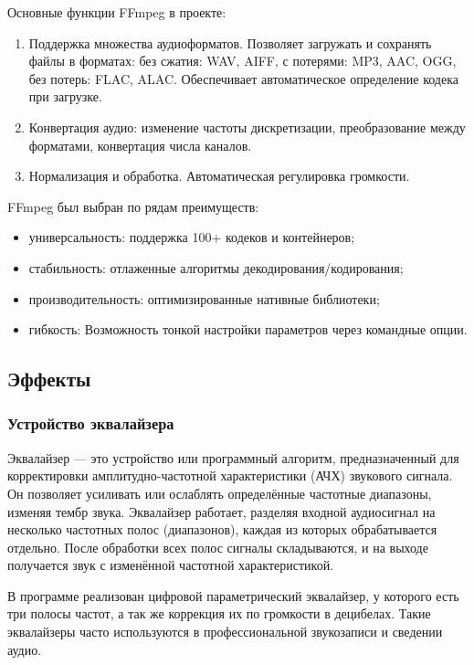Основные функции FFmpeg в проекте:
\begin{enumerate}
	\item Поддержка множества аудиоформатов. Позволяет загружать и сохранять файлы в форматах: без сжатия: WAV, AIFF, с потерями: MP3, AAC, OGG, без потерь: FLAC, ALAC. Обеспечивает автоматическое определение кодека при загрузке.
	\item Конвертация аудио: изменение частоты дискретизации, преобразование между форматами, конвертация числа каналов.
	\item Нормализация и обработка. Автоматическая регулировка громкости.
\end{enumerate}

FFmpeg был выбран по рядам преимуществ:
\begin{itemize}
	\item универсальность: поддержка 100+ кодеков и контейнеров;
	\item стабильность: отлаженные алгоритмы декодирования/кодирования;
	\item производительность: оптимизированные нативные библиотеки;
	\item гибкость: Возможность тонкой настройки параметров через командные опции.
\end{itemize}

\subsection{Эффекты}

\subsubsection{Устройство эквалайзера}

Эквалайзер — это устройство или программный алгоритм, предназначенный для корректировки амплитудно-частотной характеристики (АЧХ) звукового сигнала. Он позволяет усиливать или ослаблять определённые частотные диапазоны, изменяя тембр звука. Эквалайзер работает, разделяя входной аудиосигнал на несколько частотных полос (диапазонов), каждая из которых обрабатывается отдельно. После обработки всех полос сигналы складываются, и на выходе получается звук с изменённой частотной характеристикой.

В программе реализован цифровой параметрический эквалайзер, у которого есть три полосы частот, а так же коррекция их по громкости в децибелах. Такие эквалайзеры часто используются в профессиональной звукозаписи и сведении аудио.

